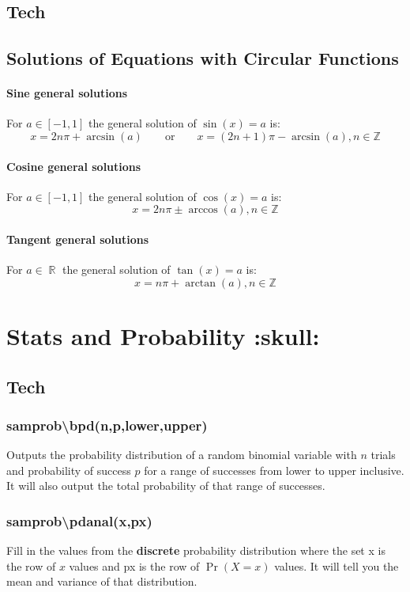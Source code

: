 \documentclass[a4paper,twoside]{article}
\DeclareMathOperator\R{\mathbb{R}}
\begin{document}
		\subsection{Tech}
			
		\subsection{Solutions of Equations with Circular Functions}
			\paragraph{Sine general solutions} For $a\in[-1,1]$ the general solution of $\sin(x)=a$ is:
			\[
				x=2n\pi+\arcsin(a)\qquad\text{or}\qquad x=(2n+1)\pi-\arcsin(a),n\in\mathbb{Z}
			\]
			\paragraph{Cosine general solutions} For $a\in[-1,1]$ the general solution of $\cos(x)=a$ is:
			\[
				x=2n\pi\pm\arccos(a),n\in\mathbb{Z}
			\]
			\paragraph{Tangent general solutions} For $a\in\R$ the general solution of $\tan(x)=a$ is:
			\[
				x=n\pi+\arctan(a),n\in\mathbb{Z}
			\]
	\section{Stats and Probability :skull:}
		\subsection{Tech}
			\subsubsection{sam\textunderscore prob\textbackslash bpd(n,p,lower,upper)} Outputs the probability distribution of a random binomial variable with $n$ trials and probability of success $p$ for a range of successes from lower to upper inclusive. It will also output the total probability of that range of successes.
			\subsubsection{sam\textunderscore prob\textbackslash pdanal({x},{px})}
			Fill in the values from the \textbf{discrete} probability distribution where the set {x} is the row of $x$ values and {px} is the row of $\Pr(X=x)$ values. It will tell you the mean and variance of that distribution.
\end{document}
